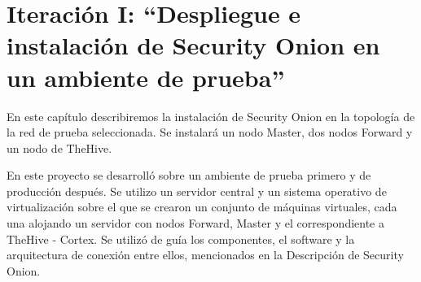 \chapter{Iteración I: “Despliegue e instalación de Security Onion en un ambiente de prueba”}
    En este capítulo describiremos la instalación de Security Onion en la topología de la red de prueba seleccionada. Se instalará un nodo Master, dos nodos Forward y un nodo de TheHive. \par
    En este proyecto se desarrolló sobre un ambiente de prueba primero y de producción después. Se utilizo un servidor central y un sistema operativo de virtualización sobre el que se crearon un conjunto de máquinas virtuales, cada una alojando un servidor con nodos Forward, Master y el correspondiente a TheHive - Cortex. Se utilizó de guía los componentes, el software y la arquitectura de conexión entre ellos, mencionados en la Descripción de Security Onion.

